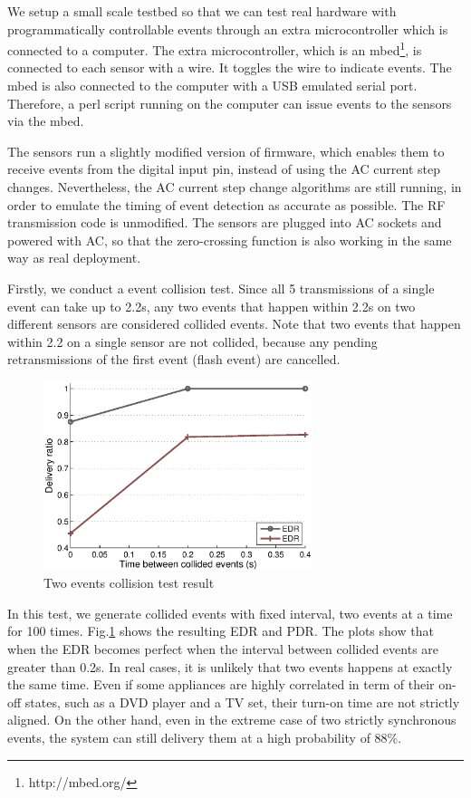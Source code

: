 We setup a small scale testbed so that we can test real hardware with programmatically controllable events through an extra microcontroller which is connected to a computer. The extra microcontroller, which is an mbed\footnote{http://mbed.org/}, is connected to each sensor with a wire. It toggles the wire to indicate events. The mbed is also connected to the computer with a USB emulated serial port. Therefore, a perl script running on the computer can issue events to the sensors via the mbed. 

The sensors run a slightly modified version of firmware, which enables them to receive events from the digital input pin, instead of using the AC current step changes. Nevertheless, the AC current step change algorithms are still running, in order to emulate the timing of event detection as accurate as possible. The RF transmission code is unmodified. The sensors are plugged into AC sockets and powered with AC, so that the zero-crossing function is also working in the same way as real deployment. 

Firstly, we conduct a event collision test. Since all 5 transmissions of a single event can take up to 2.2s, any two events that happen within 2.2s on two different sensors are considered collided events. Note that two events that happen within 2.2 on a single sensor are not collided, because any pending retransmissions of the first event (flash event) are cancelled. 

\begin{figure}[htb]
  \centering
  \includegraphics[width=0.7\textwidth]{../../sw/pc/matlab/testbed-result/collision}
  \caption{Two events collision test result}
  \label{fig:collision}
\end{figure}

In this test, we generate collided events with fixed interval, two events at a time for 100 times. Fig.\ref{fig:collision} shows the resulting EDR and PDR. The plots show that when the EDR becomes perfect when the interval between collided events are greater than 0.2s. In real cases, it is unlikely that two events happens at exactly the same time. Even if some appliances are highly correlated in term of their on-off states, such as a DVD player and a TV set, their turn-on time are not strictly aligned. On the other hand, even in the extreme case of two strictly synchronous events, the system can still delivery them at a high probability of 88\%. 

